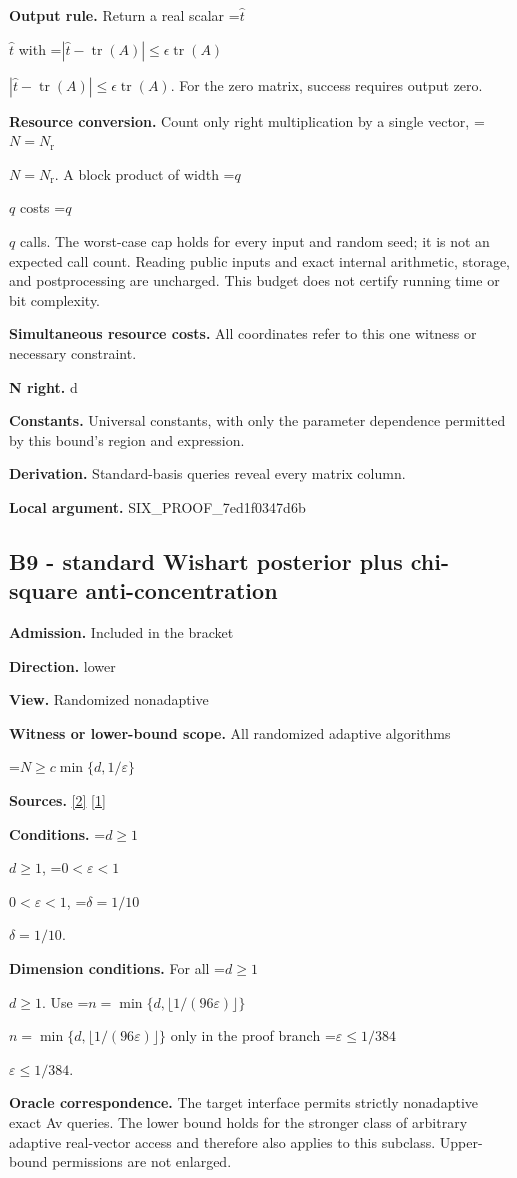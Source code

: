 \documentclass[10pt,a4paper]{article}
\newcommand{\AtlasMath}[1]{\par\begingroup\centering\setbox0=\hbox{$\displaystyle #1$}\ifdim\wd0>1.4\linewidth\typeout{ATLAS WIDE FORMULA: \the\wd0}\fi\ifdim\wd0>\linewidth\resizebox{\linewidth}{!}{\box0}\else\box0\fi\par\endgroup}
\newcommand{\AtlasInlineMath}[1]{\begingroup\setbox0=\hbox{$#1$}\ifdim\wd0>.4\linewidth\endgroup\AtlasMath{#1}\else\endgroup$#1$\fi}
\begin{document}
\textbf{Output rule.} Return a real scalar \AtlasInlineMath{\widehat t} with \AtlasInlineMath{|\widehat t-\operatorname{tr}(A)|\le\epsilon\operatorname{tr}(A)}. For the zero matrix, success requires output zero.

\textbf{Resource conversion.} Count only right multiplication by a single vector, \AtlasInlineMath{N=N_{\mathrm r}}. A block product of width \AtlasInlineMath{q} costs \AtlasInlineMath{q} calls. The worst-case cap holds for every input and random seed; it is not an expected call count. Reading public inputs and exact internal arithmetic, storage, and postprocessing are uncharged. This budget does not certify running time or bit complexity.

\textbf{Simultaneous resource costs.} All coordinates refer to this one witness or necessary constraint.

\textbf{N right.} d

\textbf{Constants.} Universal constants, with only the parameter dependence permitted by this bound’s region and expression.

\textbf{Derivation.} Standard-basis queries reveal every matrix column.

\textbf{Local argument.} SIX\_\allowbreak{}PROOF\_\allowbreak{}7ed1f0347d6b

\subsection{B9 - standard Wishart posterior plus chi-square anti-concentration}
\textbf{Admission.} Included in the bracket

\textbf{Direction.} lower

\textbf{View.} Randomized nonadaptive

\textbf{Witness or lower-bound scope.} All randomized adaptive algorithms

\AtlasMath{N\ge c\min\{d,1/\varepsilon\}}
\textbf{Sources.} \href{https://arxiv.org/pdf/2402.09379v3}{[2]} \href{https://proceedings.mlr.press/v125/braverman20a/braverman20a.pdf}{[1]}

\textbf{Conditions.} \AtlasInlineMath{d\ge1}, \AtlasInlineMath{0<\varepsilon<1}, \AtlasInlineMath{\delta=1/10}.

\textbf{Dimension conditions.} For all \AtlasInlineMath{d\ge1}. Use \AtlasInlineMath{n=\min\{d,\lfloor1/(96\varepsilon)\rfloor\}} only in the proof branch \AtlasInlineMath{\varepsilon\le1/384}.

\textbf{Oracle correspondence.} The target interface permits strictly nonadaptive exact Av queries. The lower bound holds for the stronger class of arbitrary adaptive real-vector access and therefore also applies to this subclass. Upper-bound permissions are not enlarged.
\end{document}
